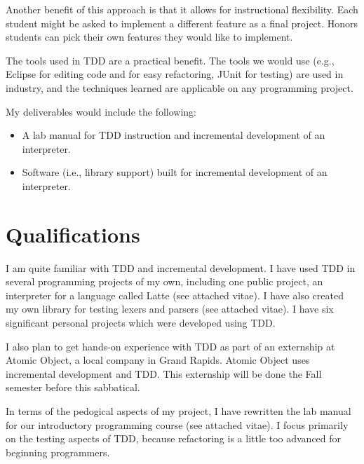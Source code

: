 \documentclass{article}
\begin{document}
Another benefit of this approach is that it allows for instructional flexibility.  Each student might be asked to implement a different feature as a final project.  Honors students can pick their own features they would like to implement.

The tools used in TDD are a practical benefit.  The tools we would use (e.g., Eclipse for editing code and for easy refactoring, JUnit for testing) are used in industry, and the techniques learned are applicable on any programming project.

My deliverables would include the following:
\begin{itemize}
\item A lab manual for TDD instruction and incremental development of an interpreter.
\item Software (i.e., library support) built for incremental development of an interpreter.
\end{itemize}


\section*{Qualifications}

I am quite familiar with TDD and incremental development.  I have used TDD in several programming projects of my own, including one public project, an interpreter for a language called Latte (see attached vitae).  I have also created my own library for testing lexers and parsers (see attached vitae).  I have six significant personal projects which were developed using TDD.

I also plan to get hands-on experience with TDD as part of an externship at Atomic Object, a local company in Grand Rapids.  Atomic Object uses incremental development and TDD.  This externship will be done the Fall semester before this sabbatical.

In terms of the pedogical aspects of my project, I have rewritten the lab manual for our introductory programming course (see attached vitae).  I focus primarily on the testing aspects of TDD, because refactoring is a little too advanced for beginning programmers.
\end{document}
